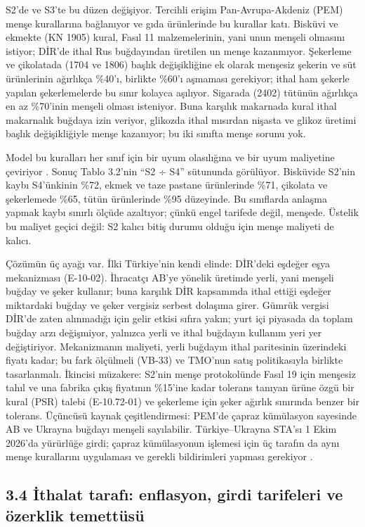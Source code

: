S2'de ve S3'te bu düzen değişiyor. Tercihli erişim Pan-Avrupa-Akdeniz (PEM) menşe kurallarına bağlanıyor ve gıda ürünlerinde bu kurallar katı. Bisküvi ve ekmekte (KN 1905) kural, Fasıl 11 malzemelerinin, yani unun menşeli olmasını istiyor; DİR'de ithal Rus buğdayından üretilen un menşe kazanmıyor. Şekerleme ve çikolatada (1704 ve 1806) başlık değişikliğine ek olarak menşesiz şekerin ve süt ürünlerinin ağırlıkça \%40'ı, birlikte \%60'ı aşmaması gerekiyor; ithal ham şekerle yapılan şekerlemelerde bu sınır kolayca aşılıyor. Sigarada (2402) tütünün ağırlıkça en az \%70'inin menşeli olması isteniyor. Buna karşılık makarnada kural ithal makarnalık buğdaya izin veriyor, glikozda ithal mısırdan nişasta ve glikoz üretimi başlık değişikliğiyle menşe kazanıyor; bu iki sınıfta menşe sorunu yok.

Model bu kuralları her sınıf için bir uyum olasılığına ve bir uyum maliyetine çeviriyor \etiketH{}. Sonuç Tablo 3.2'nin ``S2 ÷ S4'' sütununda görülüyor. Bisküvide S2'nin kaybı S4'ünkinin \%72, ekmek ve taze pastane ürünlerinde \%71, çikolata ve şekerlemede \%65, tütün ürünlerinde \%95 düzeyinde. Bu sınıflarda anlaşma yapmak kaybı sınırlı ölçüde azaltıyor; çünkü engel tarifede değil, menşede. Üstelik bu maliyet geçici değil: S2 kalıcı bitiş durumu olduğu için menşe maliyeti de kalıcı.

Çözümün üç ayağı var. İlki Türkiye'nin kendi elinde: DİR'deki eşdeğer eşya mekanizması (E-10-02). İhracatçı AB'ye yönelik üretimde yerli, yani menşeli buğday ve şeker kullanır; buna karşılık DİR kapsamında ithal ettiği eşdeğer miktardaki buğday ve şeker vergisiz serbest dolaşıma girer. Gümrük vergisi DİR'de zaten alınmadığı için gelir etkisi sıfıra yakın; yurt içi piyasada da toplam buğday arzı değişmiyor, yalnızca yerli ve ithal buğdayın kullanım yeri yer değiştiriyor. Mekanizmanın maliyeti, yerli buğdayın ithal paritesinin üzerindeki fiyatı kadar; bu fark ölçülmeli (VB-33) ve TMO'nun satış politikasıyla birlikte tasarlanmalı. İkincisi müzakere: S2'nin menşe protokolünde Fasıl 19 için menşesiz tahıl ve una fabrika çıkış fiyatının \%15'ine kadar tolerans tanıyan ürüne özgü bir kural (PSR) talebi (E-10.72-01) ve şekerleme için şeker ağırlık sınırında benzer bir tolerans. Üçüncüsü kaynak çeşitlendirmesi: PEM'de çapraz kümülasyon sayesinde AB ve Ukrayna buğdayı menşeli sayılabilir. Türkiye--Ukrayna STA'sı 1 Ekim 2026'da yürürlüğe girdi; çapraz kümülasyonun işlemesi için üç tarafın da aynı menşe kurallarını uygulaması ve gerekli bildirimleri yapması gerekiyor \etiketD{}.

\hypertarget{nace_kartlar_10-12-34-iux307thalat-tarafux131-enflasyon-girdi-tarifeleri-ve-uxf6zerklik-temettuxfcsuxfc}{%
\subsection{3.4 İthalat tarafı: enflasyon, girdi tarifeleri ve özerklik temettüsü}\label{nace_kartlar_10-12-34-iux307thalat-tarafux131-enflasyon-girdi-tarifeleri-ve-uxf6zerklik-temettuxfcsuxfc}}

